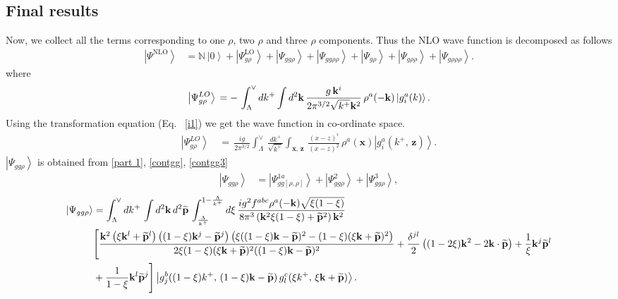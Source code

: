 \documentclass[aps,prd,amsmath,amssymb,nofootinbib]{revtex4-2}
\def\mf#1{\mathbb{#1}}
\numberwithin{equation}{section}
\begin{document}
 \subsection{Final results}
Now, we collect all the terms corresponding to one $\rho$, two $\rho$ and three $\rho$ components. Thus the NLO wave function is decomposed as follows
\begin{align}\label{NLOWF}
\left|\Psi^{\text{NLO}}\right\rangle & = \mf{N}\,\left|0\right\rangle +\left|\Psi_{g\rho}^{\text{LO}}\right\rangle  
+\left|\Psi_{gg\rho}\right\rangle +\left|\Psi_{gg\rho\rho}\right\rangle +\left|\Psi_{g\rho}\right\rangle +\left|\Psi_{g\rho\rho}\right\rangle +
\left|\Psi_{g\rho\rho\rho}\right\rangle .
\end{align}
where
\begin{equation}\label{lowav1mom}
\left|\Psi_{g\rho}^{LO}\right\rangle \,=\- -\,\int_{\Lambda}^{\vee}dk^{+}\int d^{2}\mathbf{k}\,\frac{g\, \mathbf{k}^{i}}{2\pi^{3/2}\sqrt{k^{+}}\mathbf{k}^{2}}\,\rho^{a}(-\mathbf{k})\left|g_{i}^{a}(k)\right\rangle .
\end{equation}
Using the transformation equation (Eq.~ \eqref{i1}) we get the wave function in co-ordinate space.
\begin{align}\label{lowav1}
\left|\Psi_{g\rho}^{LO}\right\rangle \,& =\,\frac{ig}{2\pi^{3/2}}\int_{\Lambda}^{\vee}\,\frac{dk^{+}}{\sqrt{k^{+}}}\int_{\mathbf{x},\, \mathbf{z}}\,\frac{ (x-z)^{i}}{(x-z)^{2}}\,\rho^{a}(\mathbf{x})\left|g_{i}^{a}(k^{+},\, \mathbf{z})\right\rangle .
 \end{align}
$\left|\Psi_{gg\rho}\right\rangle$ is obtained from \eqref{part 1}, \eqref{contgg}, \eqref{contgg3}
\begin{align}
    \left|\Psi_{gg\rho}\right\rangle  & = \left|\Psi^{1a}_{gg[\rho,\rho]}\right\rangle + \left|\Psi^{2}_{gg\rho}\right\rangle + \left|\Psi^{3}_{gg\rho}\right\rangle,
\end{align}
\begin{align}\label{psiggrhomom}
    \left|\Psi_{gg\rho}\right\rangle  & = \int_{\Lambda}^{\vee}dk^{+}\,\int d^{2}\mathbf{k}\, d^{2}\widetilde{\mathbf{p}}\,\int_{\frac{\Lambda}{k^{+}}}^{1-\frac{\Lambda}{k^{+}}}d\xi\,\frac{ig^{2}f^{abc}\rho^{a}(-\mathbf{k})\sqrt{\xi(1-\xi)}}{8\pi^{3}\left(\mathbf{k}^{2}\xi(1-\xi)+\widetilde{\mathbf{p}}^{2}\right)\mathbf{k}^{2}}\notag \\
&\Bigg[\frac{\mathbf{k}^{2}\left(\xi \mathbf{k}^{l}+\widetilde{\mathbf{p}}^{l}\right)\left((1-\xi)\mathbf{k}^{j}-\widetilde{\mathbf{p}}^{j}\right)\left(\xi((1-\xi)\mathbf{k}-\widetilde{\mathbf{p}})^{2}-(1-\xi)(\xi \mathbf{k}+\widetilde{\mathbf{p}})^{2}\right)}{2\xi(1-\xi)(\xi \mathbf{k}+\widetilde{\mathbf{p}})^{2}((1-\xi)\mathbf{k}-\widetilde{\mathbf{p}})^{2}}+\frac{\delta^{jl}}{2}\left((1-2\xi)\mathbf{k}^{2}-2\mathbf{k}\cdot\widetilde{\mathbf{p}}\right)+\frac{1}{\xi}\mathbf{k}^{j}\widetilde{\mathbf{p}}^{l}\notag \\ & +\frac{1}{1-\xi}\mathbf{k}^{l}\widetilde{\mathbf{p}}^{j}\Bigg] \left|g_{j}^{b}((1-\xi)k^{+},\,(1-\xi)\mathbf{k}-\widetilde{\mathbf{p}})\, g_{l}^{c}(\xi k^{+},\,\xi\mathbf{k}+\widetilde{\mathbf{p}})\right\rangle.
\end{align}
\end{document}
